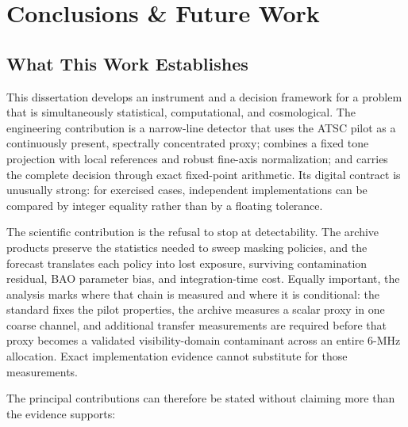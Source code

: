 \chapter{Conclusions \& Future Work}
\label{sec:conclusions}

\section{What This Work Establishes}
\label{sec:conclusions:contributions}

This dissertation develops an instrument and a decision framework for a problem
that is simultaneously statistical, computational, and cosmological.  The
engineering contribution is a narrow-line detector that uses the ATSC pilot as
a continuously present, spectrally concentrated proxy; combines a fixed tone
projection with local references and robust fine-axis normalization; and carries
the complete decision through exact fixed-point arithmetic.  Its digital
contract is unusually strong: for exercised cases, independent implementations
can be compared by integer equality rather than by a floating tolerance.

The scientific contribution is the refusal to stop at detectability.  The
archive products preserve the statistics needed to sweep masking policies, and
the forecast translates each policy into lost exposure, surviving contamination residual, BAO
parameter bias, and integration-time cost.  Equally important, the
analysis marks where that chain is measured and where it is conditional: the
standard fixes the pilot properties, the archive measures a scalar proxy in one
coarse channel, and additional transfer measurements are required before that
proxy becomes a validated visibility-domain contaminant across an entire 6-MHz
allocation.  Exact implementation evidence cannot substitute for those
measurements.


The principal contributions can therefore be stated without claiming more than
the evidence supports:

